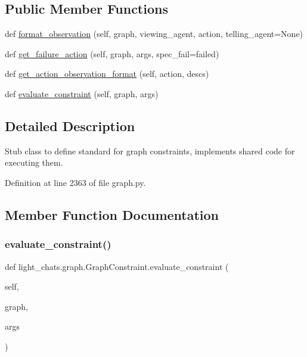 \subsection*{Public Member Functions}
\begin{DoxyCompactItemize}
\item 
def \hyperlink{classlight__chats_1_1graph_1_1GraphConstraint_aa2918a7125065dcd76dd0ee09650fd38}{format\+\_\+observation} (self, graph, viewing\+\_\+agent, action, telling\+\_\+agent=None)
\item 
def \hyperlink{classlight__chats_1_1graph_1_1GraphConstraint_ac824a43559c367bf625f79559f026c6b}{get\+\_\+failure\+\_\+action} (self, graph, args, spec\+\_\+fail=\textquotesingle{}failed\textquotesingle{})
\item 
def \hyperlink{classlight__chats_1_1graph_1_1GraphConstraint_a53754bb6025c16b76718f44dad075733}{get\+\_\+action\+\_\+observation\+\_\+format} (self, action, descs)
\item 
def \hyperlink{classlight__chats_1_1graph_1_1GraphConstraint_ac196aba3dee4fc3bf7284dc764866659}{evaluate\+\_\+constraint} (self, graph, args)
\end{DoxyCompactItemize}


\subsection{Detailed Description}
\begin{DoxyVerb}Stub class to define standard for graph constraints, implements shared code for
executing them.
\end{DoxyVerb}
 

Definition at line 2363 of file graph.\+py.



\subsection{Member Function Documentation}
\mbox{\label{classlight__chats_1_1graph_1_1GraphConstraint_ac196aba3dee4fc3bf7284dc764866659}} 
\subsubsection{\texorpdfstring{evaluate\+\_\+constraint()}{evaluate\_constraint()}}
{\footnotesize\ttfamily def light\+\_\+chats.\+graph.\+Graph\+Constraint.\+evaluate\+\_\+constraint (\begin{DoxyParamCaption}\item[{}]{self,  }\item[{}]{graph,  }\item[{}]{args }\end{DoxyParamCaption})}

